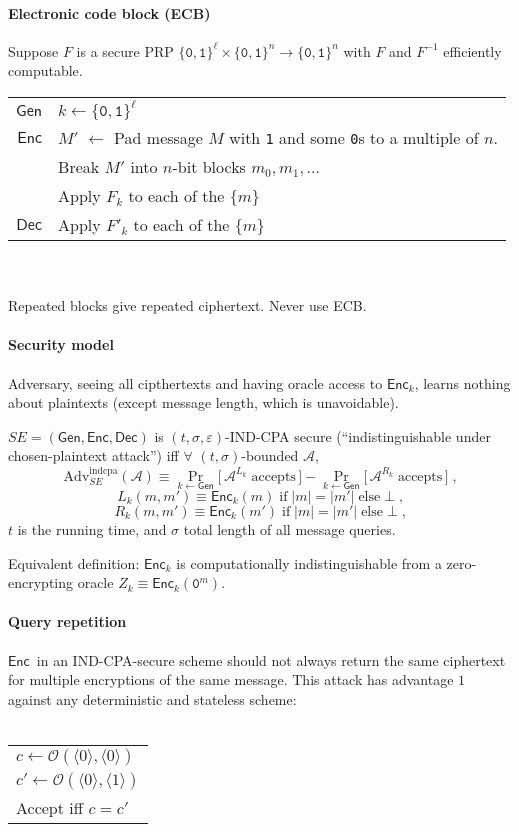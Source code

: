 \documentclass[11pt]{article}
\newcommand{\eqdef}{\ensuremath{\equiv}}
\newcommand{\Gen}{\ensuremath{\mathsf{Gen}}}
\newcommand{\Enc}{\ensuremath{\mathsf{Enc}}}
\newcommand{\Dec}{\ensuremath{\mathsf{Dec}}}
\newcommand{\eps}{\ensuremath{\varepsilon}}
\newcommand{\bit}{\ensuremath{\{\texttt{0},\texttt{1}\}}}
\newcommand{\ang}[1]{\ensuremath{\langle#1\rangle}}
\theoremstyle{remark}
\begin{document}
\paragraph{Electronic code block (ECB)}
Suppose $F$ is a secure PRP
$\bit^\ell\times\bit^n\rightarrow\bit^n$
with $F$ and $F^{-1}$ efficiently computable.
~\\[5pt]
\begin{tabular}{r|l}
\Gen & $k \leftarrow \bit^\ell$ \\[5pt]
\Enc & $M'$ $\leftarrow$ Pad message $M$
       with \texttt{1} and some \texttt{0}s
       to a multiple of $n$. \\
     & Break $M'$ into $n$-bit blocks $m_0, m_1, \ldots$ \\
     & Apply $F_k$ to each of the $\{m\}$ \\[5pt]
\Dec & Apply $F'_k$ to each of the $\{m\}$
\end{tabular}\\\\
Repeated blocks give repeated ciphertext.
Never use ECB.

\paragraph{Security model}
Adversary, seeing all cipthertexts and
having oracle access to $\Enc_k$,
learns nothing about plaintexts
(except message length, which is unavoidable).

$SE = (\Gen, \Enc, \Dec)$ is
$(t, \sigma, \eps)$-IND-CPA secure
(``indistinguishable under chosen-plaintext attack'')
iff $\forall$ $(t, \sigma)$-bounded $\mathcal{A}$, \[
\text{Adv}_{SE}^\text{indcpa}(\mathcal{A}) \eqdef
\Pr_{k \leftarrow \Gen} \big[\, \mathcal{A}^{L_k} \; \text{accepts} \,\big]
- \Pr_{k \leftarrow \Gen} \big[\, \mathcal{A}^{R_k} \; \text{accepts} \,\big]
\;\text{,}
\]
\[ L_k(m, m') \eqdef \Enc_k(m)
\;\text{if}\; |m| = |m'|\;\text{else}\; \bot \;\text{,} \]
\[ R_k(m, m') \eqdef \Enc_k(m')
\;\text{if}\; |m| = |m'|\;\text{else}\; \bot \;\text{,} \]
$t$ is the running time, and
$\sigma$ total length of all message queries.

Equivalent definition:
$\Enc_k$ is computationally indistinguishable from
a zero-encrypting oracle $Z_k \eqdef \Enc_k(\texttt{0}^m)$.

\paragraph{Query repetition}
\Enc\ in an IND-CPA-secure scheme should not always return the same ciphertext
for multiple encryptions of the same message.
This attack has advantage $1$ against any deterministic and stateless scheme:
\\~\\
\begin{tabular}{|l}
$c \leftarrow \mathcal{O}(\ang{0}, \ang{0})$\\
$c' \leftarrow \mathcal{O}(\ang{0}, \ang{1})$\\
Accept iff $c = c'$
\end{tabular}
\end{document}
